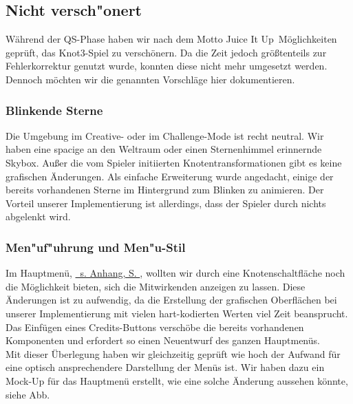 %



\newpage



\subsection{Nicht versch{"o}nert} %
\label{Abschnitt:Aenderungen:Protokoll:Verschoenerungen:Nicht}

Während der QS-Phase haben wir nach dem Motto \glqq Juice It Up\grqq~Möglichkeiten geprüft, das Knot3-Spiel zu verschönern. Da die Zeit jedoch größtenteils zur Fehlerkorrektur genutzt wurde, konnten diese nicht mehr umgesetzt werden. Dennoch möchten wir die genannten Vorschläge hier dokumentieren.\\


\subsubsection*{Blinkende Sterne}
\label{Abschnitt:Aenderungen:Protokoll:Verschoenerungen:Nicht:Blinkende_Sterne}

Die Umgebung im Creative- oder im Challenge-Mode ist recht neutral. Wir haben eine spacige an den Weltraum oder einen Sternenhimmel erinnernde Skybox. Außer die vom Spieler initiierten Knotentransformationen gibt es keine grafischen Änderungen. Als einfache Erweiterung wurde angedacht, einige der bereits vorhandenen Sterne im Hintergrund zum Blinken zu animieren. Der Vorteil unserer Implementierung ist allerdings, dass der Spieler durch nichts abgelenkt wird.\\

\subsubsection*{Men{"u}f{"u}hrung und Men{"u}-Stil}
\label{Abschnitt:Aenderungen:Protokoll:Verschoenerungen:Nicht:Menues}

Im Hauptmenü, \hyperref[Abschnitt:Anhang:Aenderungen:Nicht]{ \mousecursor~s. Anhang, S. \pageref{Abschnitt:Anhang:Aenderungen:Nicht}}, wollten wir durch eine Knotenschaltfläche noch die Möglichkeit bieten, sich die Mitwirkenden anzeigen zu lassen. Diese Änderungen ist zu aufwendig, da die Erstellung der grafischen Oberflächen bei unserer Implementierung mit vielen hart-kodierten Werten viel Zeit beansprucht. Das Einfügen eines Credits-Buttons verschöbe die bereits vorhandenen Komponenten und erfordert so einen Neuentwurf des ganzen Hauptmenüs.\\

Mit dieser Überlegung haben wir gleichzeitig geprüft wie hoch der Aufwand für eine optisch ansprechendere Darstellung der Menüs ist. Wir haben dazu ein Mock-Up für das Hauptmenü erstellt, wie eine solche Änderung aussehen könnte, siehe Abb.\\







